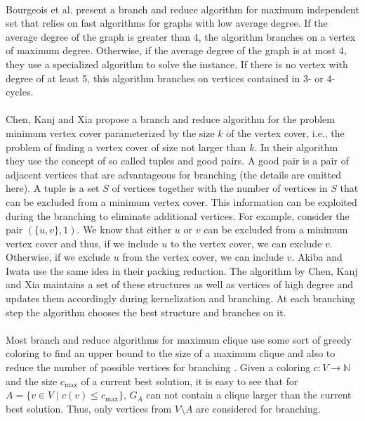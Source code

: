 \documentclass[12pt,a4paper,twoside]{scrartcl}
\numberwithin{equation}{section}
\begin{document}
\paragraph{}
Bourgeois et al. \cite{Bourgeois} present a branch and reduce algorithm for maximum independent set that relies on fast algorithms for graphs with low average degree. If the average degree of the graph is greater than 4, the algorithm branches on a vertex of maximum degree. Otherwise, if the average degree of the graph is at most 4, they use a specialized algorithm to solve the instance. If there is no vertex with degree of at least 5, this algorithm branches on vertices contained in 3- or 4-cycles.

\paragraph{}
Chen, Kanj and Xia \cite{ChenXiaKanj} propose a branch and reduce algorithm for the problem minimum vertex cover parameterized by the size $k$ of the vertex cover, i.e., the problem of finding a vertex cover of size not larger than $k$. In their algorithm they use the concept of so called tuples and good pairs. A good pair is a pair of adjacent vertices that are advantageous for branching (the details are omitted here). A tuple is a set $S$ of vertices together with the number of vertices in $S$ that can be excluded from a minimum vertex cover. This information can be exploited during the branching to eliminate additional vertices. For example, consider the pair $(\{u,v\}, 1)$. We know that either $u$ or $v$ can be excluded from a minimum vertex cover and thus, if we include $u$ to the vertex cover, we can exclude $v$. Otherwise, if we exclude $u$ from the vertex cover, we can include $v$. Akiba and Iwata \cite{AkibaIwata} use the same idea in their packing reduction. The algorithm by Chen, Kanj and Xia maintains a set of these structures as well as vertices of high degree and updates them accordingly during kernelization and branching. At each branching step the algorithm chooses the best structure and branches on it.

\paragraph{}
Most branch and reduce algorithms for maximum clique use some sort of greedy coloring to find an upper bound to the size of a maximum clique and also to reduce the number of possible vertices for branching \cite{Color}. Given a coloring $c:V \rightarrow \mathbb{N}$ and the size $c_\text{max}$ of a current best solution, it is easy to see that for $A = \{v\in V \;|\; c(v)\leq c_\text{max}\}$, $G_A$ can not contain a clique larger than the current best solution. Thus, only vertices from $V\setminus A$ are considered for branching.
\end{document}
